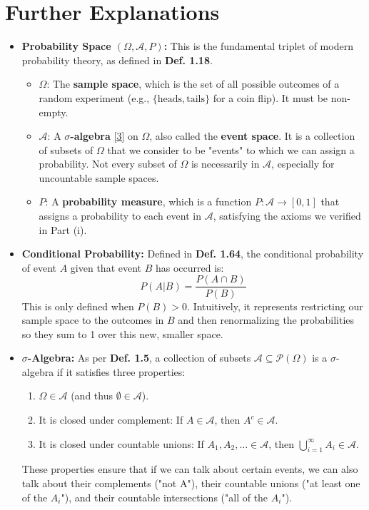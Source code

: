 \documentclass[11pt,a4paper]{article}
\newcommand{\explanation}[2]{\item[\hypertarget{note#1}{\textcolor{blue}{[#1]}}] \textbf{#2}}
\begin{document}
\newpage
\section*{Further Explanations}
\begin{itemize}
    \explanation{1}{Probability Space \((\Omega, \mathcal{A}, P)\):} This is the fundamental triplet of modern probability theory, as defined in \textbf{Def. 1.18}.
    \begin{itemize}
        \item \(\Omega\): The \textbf{sample space}, which is the set of all possible outcomes of a random experiment (e.g., \(\{\text{heads}, \text{tails}\}\) for a coin flip). It must be non-empty.
        \item \(\mathcal{A}\): A \textbf{\(\sigma\)-algebra} \hyperlink{note3}{[3]} on \(\Omega\), also called the \textbf{event space}. It is a collection of subsets of \(\Omega\) that we consider to be "events" to which we can assign a probability. Not every subset of \(\Omega\) is necessarily in \(\mathcal{A}\), especially for uncountable sample spaces.
        \item \(P\): A \textbf{probability measure}, which is a function \(P: \mathcal{A} \to [0, 1]\) that assigns a probability to each event in \(\mathcal{A}\), satisfying the axioms we verified in Part (i).
    \end{itemize}

    \explanation{2}{Conditional Probability:} Defined in \textbf{Def. 1.64}, the conditional probability of event \(A\) given that event \(B\) has occurred is:
    \[ P(A | B) = \frac{P(A \cap B)}{P(B)} \]
    This is only defined when \(P(B) > 0\). Intuitively, it represents restricting our sample space to the outcomes in \(B\) and then renormalizing the probabilities so they sum to 1 over this new, smaller space.

    \explanation{3}{\(\sigma\)-Algebra:} As per \textbf{Def. 1.5}, a collection of subsets \(\mathcal{A} \subseteq \mathcal{P}(\Omega)\) is a \(\sigma\)-algebra if it satisfies three properties:
    \begin{enumerate}
        \item \(\Omega \in \mathcal{A}\) (and thus \(\emptyset \in \mathcal{A}\)).
        \item It is closed under complement: If \(A \in \mathcal{A}\), then \(A^c \in \mathcal{A}\).
        \item It is closed under countable unions: If \(A_1, A_2, \dots \in \mathcal{A}\), then \(\bigcup_{i=1}^\infty A_i \in \mathcal{A}\).
    \end{enumerate}
    These properties ensure that if we can talk about certain events, we can also talk about their complements ("not A"), their countable unions ("at least one of the \(A_i\)"), and their countable intersections ("all of the \(A_i\)").


\end{itemize}
\end{document}
